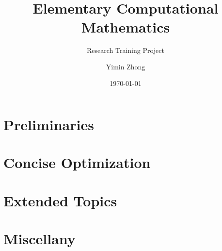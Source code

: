 \documentclass[12pt,a4paper,final]{book}
\title{Elementary Computational Mathematics}
\subtitle{Research Training Project}
\author{Yimin Zhong}
\date{\today}
\begin{document}
\maketitle
\frontmatter

\tableofcontents
\mainmatter
\part{Preliminaries}









\part{Concise Optimization}

\part{Extended Topics}

\part{Miscellany}
\end{document}
